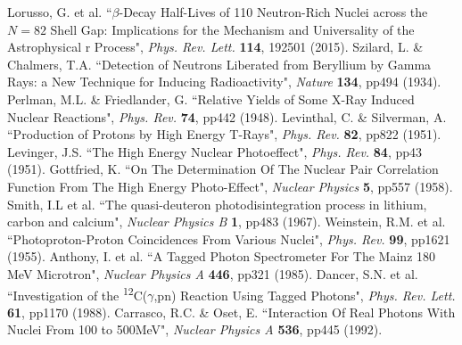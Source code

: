 \documentclass[a4paper,12pt]{article}
\begin{document}
\begin{thebibliography}{99}
 Lorusso, G. et al. ``$\beta$-Decay Half-Lives of 110 Neutron-Rich Nuclei across the $N=82$ Shell Gap: Implications for the Mechanism and Universality of the Astrophysical r Process", \textit{Phys. Rev. Lett.} \textbf{114}, 192501 (2015).
 Szilard, L. \& Chalmers, T.A. ``Detection of Neutrons Liberated from Beryllium by Gamma Rays: a New Technique for Inducing Radioactivity", \textit{Nature} \textbf{134}, pp494 (1934).
 Perlman, M.L. \& Friedlander, G. ``Relative Yields of Some X-Ray Induced Nuclear Reactions", \textit{Phys. Rev.} \textbf{74}, pp442 (1948).
 Levinthal, C. \& Silverman, A. ``Production of Protons by High Energy T-Rays", \textit{Phys. Rev.} \textbf{82}, pp822 (1951).
 Levinger, J.S. ``The High Energy Nuclear Photoeffect", \textit{Phys. Rev.} \textbf{84}, pp43 (1951).
 Gottfried, K. ``On The Determination Of The Nuclear Pair Correlation Function From The High Energy Photo-Effect", \textit{Nuclear Physics} \textbf{5}, pp557 (1958).
 Smith, I.L et al. ``The quasi-deuteron photodisintegration process in lithium,
carbon and calcium", \textit{Nuclear Physics B} \textbf{1}, pp483 (1967).
 Weinstein, R.M. et al. ``Photoproton-Proton Coincidences From Various Nuclei", \textit{Phys. Rev.} \textbf{99}, pp1621 (1955).
 Anthony, I. et al. ``A Tagged Photon Spectrometer For The Mainz 180 MeV Microtron", \textit{Nuclear Physics A} \textbf{446}, pp321 (1985).
 Dancer, S.N. et al. ``Investigation of the \textsuperscript{12}C($\gamma$,pn) Reaction Using Tagged Photons", \textit{Phys. Rev. Lett.} \textbf{61}, pp1170 (1988).
 Carrasco, R.C. \& Oset, E. ``Interaction Of Real Photons With Nuclei From 100 to 500MeV", \textit{Nuclear Physics A} \textbf{536}, pp445 (1992).

\end{thebibliography}
\end{document}
